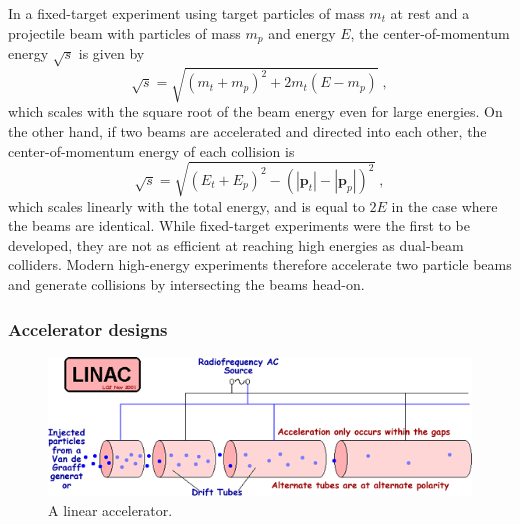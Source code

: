 In a fixed-target experiment using target particles of mass $m_t$ at rest and a projectile beam with particles of mass $m_p$ and energy $E$, the center-of-momentum energy $\sqrt{s}$ is given by
\begin{equation}
\sqrt{s} = \sqrt{(m_t+m_p)^2 + 2 m_t (E - m_p)} \; ,
\end{equation}
which scales with the square root of the beam energy even for large energies.
On the other hand, if two beams are accelerated and directed into each other, the center-of-momentum energy of each collision is
\begin{equation}
\sqrt{s} = \sqrt{(E_t + E_p)^2 - (|\mathbf{p}_t| - |\mathbf{p}_p|)^2} \; ,
\end{equation}
which scales linearly with the total energy, and is equal to $2E$ in the case where the beams are identical.
While fixed-target experiments were the first to be developed, they are not as efficient at reaching high energies as dual-beam colliders.
Modern high-energy experiments therefore accelerate two particle beams and generate collisions by intersecting the beams head-on.

\subsubsection{Accelerator designs}

\begin{figure}[t]
  \includegraphics[width=0.8\linewidth]{LINAC.png}
  \caption{A linear accelerator.}
  \label{fig:linac}
\end{figure}

